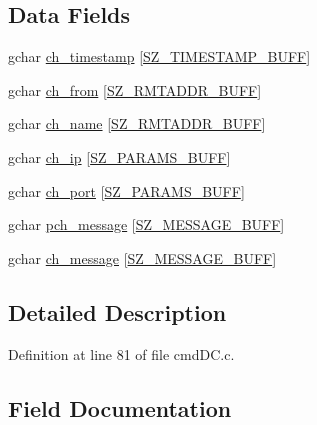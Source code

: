 \subsection*{Data Fields}
\begin{DoxyCompactItemize}
\item 
gchar \hyperlink{struct__registry_data_a362a4edf89daafe79565053dd70892c4}{ch\+\_\+timestamp} \mbox{[}\hyperlink{gtk_d_s_8c_ac08ad1b127f1c9743c5592ffb796423f}{S\+Z\+\_\+\+T\+I\+M\+E\+S\+T\+A\+M\+P\+\_\+\+B\+U\+F\+F}\mbox{]}
\item 
gchar \hyperlink{struct__registry_data_a5fac46820690525a9d8b3f0185bca587}{ch\+\_\+from} \mbox{[}\hyperlink{gtk_d_s_8c_a152ca8fa1a2eac39d1badafb6c6cef8c}{S\+Z\+\_\+\+R\+M\+T\+A\+D\+D\+R\+\_\+\+B\+U\+F\+F}\mbox{]}
\item 
gchar \hyperlink{struct__registry_data_a4764e2a72c3ba9177b6c4803cfa03f72}{ch\+\_\+name} \mbox{[}\hyperlink{gtk_d_s_8c_a152ca8fa1a2eac39d1badafb6c6cef8c}{S\+Z\+\_\+\+R\+M\+T\+A\+D\+D\+R\+\_\+\+B\+U\+F\+F}\mbox{]}
\item 
gchar \hyperlink{struct__registry_data_a814e064e77a6aac5866c88cb51acd971}{ch\+\_\+ip} \mbox{[}\hyperlink{gtk_d_s_8c_ac21e8a77d073e7a5383c92bb485992c8}{S\+Z\+\_\+\+P\+A\+R\+A\+M\+S\+\_\+\+B\+U\+F\+F}\mbox{]}
\item 
gchar \hyperlink{struct__registry_data_a74f03616af9ec9770266cb7988fe1a71}{ch\+\_\+port} \mbox{[}\hyperlink{gtk_d_s_8c_ac21e8a77d073e7a5383c92bb485992c8}{S\+Z\+\_\+\+P\+A\+R\+A\+M\+S\+\_\+\+B\+U\+F\+F}\mbox{]}
\item 
gchar \hyperlink{struct__registry_data_aad089cfecaeccff2c9c6bb7a97d46706}{pch\+\_\+message} \mbox{[}\hyperlink{gtk_d_s_8c_ab5903aa853c3769389e570c8490feb1e}{S\+Z\+\_\+\+M\+E\+S\+S\+A\+G\+E\+\_\+\+B\+U\+F\+F}\mbox{]}
\item 
gchar \hyperlink{struct__registry_data_ae9b0c1e6f13d980dcc7515def6b20b5e}{ch\+\_\+message} \mbox{[}\hyperlink{gtk_d_s_8c_ab5903aa853c3769389e570c8490feb1e}{S\+Z\+\_\+\+M\+E\+S\+S\+A\+G\+E\+\_\+\+B\+U\+F\+F}\mbox{]}
\end{DoxyCompactItemize}


\subsection{Detailed Description}


Definition at line 81 of file cmd\+D\+C.\+c.



\subsection{Field Documentation}
\hypertarget{struct__registry_data_a5fac46820690525a9d8b3f0185bca587}{}
